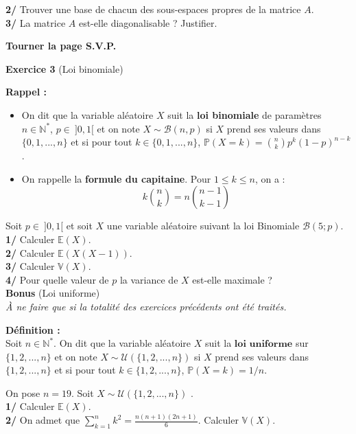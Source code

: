 \documentclass[a4paper,12pt]{article}
\newcommand{\E}{\mathbb{E}}
\newcommand{\prob}{\mathbb{P}}
\newcommand{\n}{\mathbb{N}}
\begin{document}
\textbf{2/} Trouver une base de chacun des sous-espaces propres de la matrice $A$. \\

\textbf{3/} La matrice $A$ est-elle diagonalisable ? Justifier. \\

\vfill
\begin{flushright}
\textbf{Tourner la page S.V.P.}
\end{flushright}

\textbf{Exercice 3} (Loi binomiale) \\

\begin{tcolorbox}[colframe=black, colback=white, sharp corners, width=\textwidth, boxrule=0.5mm]
\textbf{Rappel :}\\
\begin{itemize}
    \item On dit que la variable aléatoire $X$ suit la \textbf{loi binomiale} de paramètres $n \in \n^*$, $p \in \ ]0,1[$ et on note $X \sim \mathcal{B} (n,p)$ si $X$ prend ses valeurs dans $\{0,1,...,n\}$ et si pour tout $k \in \{0,1,...,n\}$, $\prob (X=k) = \binom{n}{k} p^k (1-p)^{n-k}$. \\

\item On rappelle la \textbf{formule du capitaine}. Pour $1 \leq k \leq n$, on a :
$$k \binom{n}{k} = n \binom{n-1}{k-1}$$
\end{itemize}
\end{tcolorbox}

Soit $p \in \ ]0,1[$ et soit $X$ une variable aléatoire suivant la loi Binomiale $\mathcal{B} (5; p)$. \\

\textbf{1/} Calculer $\E (X)$. \\

\textbf{2/} Calculer $\E (X(X-1))$. \\

\textbf{3/} Calculer $\mathbb{V} (X)$. \\

\textbf{4/} Pour quelle valeur de $p$ la variance de $X$ est-elle maximale ? \\

\textbf{Bonus} (Loi uniforme) \\
\textit{À ne faire que si la totalité des exercices précédents ont été traités.}

\begin{tcolorbox}[colframe=black, colback=white, sharp corners, width=\textwidth, boxrule=0.5mm]
\textbf{Définition :}\\
Soit $n \in \n^*$. On dit que la variable aléatoire $X$ suit la $\textbf{loi uniforme}$ sur $\{1,2,...,n\}$ et on note $X \sim \mathcal{U} (\{1,2,...,n\})$ si $X$ prend ses valeurs dans $\{1,2,...,n\}$ et si pour tout $k \in \{1,2,...,n\}$, $\prob (X=k) = 1/n$. 
\end{tcolorbox}

On pose $n=19$. Soit $X \sim \mathcal{U} (\{1,2,...,n \})$ . \\

\textbf{1/} Calculer $\E (X)$. \\ 

\textbf{2/} On admet que $\sum_{k=1}^n k^2= \frac{n(n+1)(2n+1)}{6}$. Calculer $\mathbb{V}(X)$. \\
\end{document}
